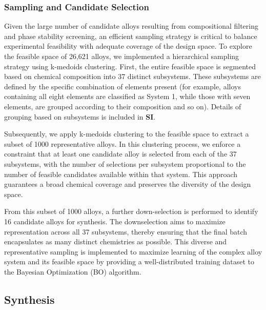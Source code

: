 \subsubsection{Sampling and Candidate Selection}

Given the large number of candidate alloys resulting from compositional filtering and phase stability screening, an efficient sampling strategy is critical to balance experimental feasibility with adequate coverage of the design space. To explore the feasible space of 26,621 alloys, we implemented a hierarchical sampling strategy using k-medoids clustering. First, the entire feasible space is segmented based on chemical composition into 37 distinct subsystems. These subsystems are defined by the specific combination of elements present (for example, alloys containing all eight elements are classified as System 1, while those with seven elements, are grouped according to their composition and so on). Details of grouping based on subsystems is included in \textbf{SI}.

Subsequently, we apply k-medoids clustering to the feasible space to extract a subset of 1000 representative alloys. In this clustering process, we enforce a constraint that at least one candidate alloy is selected from each of the 37 subsystems, with the number of selections per subsystem proportional to the number of feasible candidates available within that system. This approach guarantees a broad chemical coverage and preserves the diversity of the design space.

From this subset of 1000 alloys, a further down-selection is performed to identify 16 candidate alloys for synthesis. The downselection aims to maximize representation across all 37 subsystems, thereby ensuring that the final batch encapsulates as many distinct chemistries as possible. This diverse and representative sampling is implemented to maximize learning of the complex alloy system and its feasible space by providing a well-distributed training dataset to the Bayesian Optimization (BO) algorithm.


\subsection{Synthesis}

